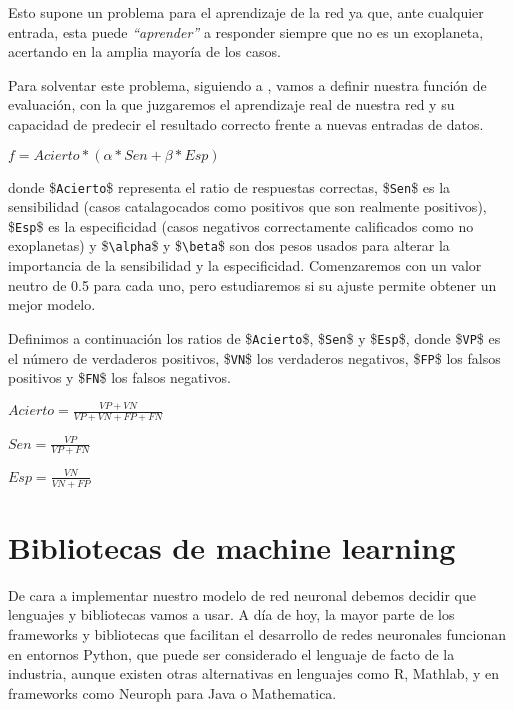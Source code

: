Esto supone un problema para el aprendizaje de la red ya que, ante
cualquier entrada, esta puede \emph{``aprender''} a responder siempre
que no es un exoplaneta, acertando en la amplia mayoría de los casos.

Para solventar este problema, siguiendo a \cite{Viloria-2006}, vamos a
definir nuestra función de evaluación, con la que juzgaremos el
aprendizaje real de nuestra red y su capacidad de predecir el resultado
correcto frente a nuevas entradas de datos.

\begin{math}
f = Acierto * (\alpha * Sen + \beta * Esp)
\end{math}

donde \$\texttt{Acierto}\$ representa el ratio de respuestas correctas,
\$\texttt{Sen}\$ es la sensibilidad (casos catalagocados como positivos
que son realmente positivos), \$\texttt{Esp}\$ es la especificidad
(casos negativos correctamente calificados como no exoplanetas) y
\$\texttt{\textbackslash{}alpha}\$ y \$\texttt{\textbackslash{}beta}\$
son dos pesos usados para alterar la importancia de la sensibilidad y la
especificidad. Comenzaremos con un valor neutro de 0.5 para cada uno,
pero estudiaremos si su ajuste permite obtener un mejor modelo.

Definimos a continuación los ratios de \$\texttt{Acierto}\$,
\$\texttt{Sen}\$ y \$\texttt{Esp}\$, donde \$\texttt{VP}\$ es el número
de verdaderos positivos, \$\texttt{VN}\$ los verdaderos negativos,
\$\texttt{FP}\$ los falsos positivos y \$\texttt{FN}\$ los falsos
negativos.

\begin{math}
Acierto = \frac{VP + VN}{VP + VN + FP + FN}
\end{math}

\begin{math}
Sen = \frac{VP}{VP + FN}
\end{math}

\begin{math}
Esp = \frac{VN}{VN + FP}
\end{math}



\section{Bibliotecas de machine learning}\label{sec:bibliotecas-de-machine-learning}

De cara a implementar nuestro modelo de red neuronal debemos decidir que
lenguajes y bibliotecas vamos a usar. A día de hoy, la mayor parte de los
frameworks y bibliotecas que facilitan el desarrollo de redes neuronales
funcionan en entornos Python, que puede ser considerado el lenguaje de
facto de la industria, aunque existen otras alternativas en lenguajes
como R, Mathlab, y en frameworks como Neuroph para Java o Mathematica.

